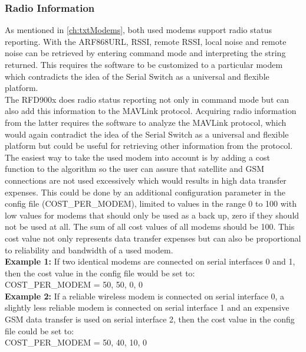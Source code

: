 \subsubsection{Radio Information}
As mentioned in \autoref{ch:txtModems}, both used modems support radio status reporting. With the ARF868URL, RSSI, remote RSSI, local noise and remote noise can be retrieved by entering command mode and interpreting the string returned. This requires the software to be customized to a particular modem which contradicts the idea of the Serial Switch as a universal and flexible platform.\\
The RFD900x does radio status reporting not only in command mode but can also add this information to the MAVLink protocol. Acquiring radio information from the latter requires the software to analyze the MAVLink protocol, which would again contradict the idea of the Serial Switch as a universal and flexible platform but could be useful for retrieving other information from the protocol.\\
The easiest way to take the used modem into account is by adding a cost function to the algorithm so the user can assure that satellite and GSM connections are not used excessively which would results in high data transfer expenses. This could be done by an additional configuration parameter in the config file (COST\_PER\_MODEM), limited to values in the range 0 to 100 with low values for modems that should only be used as a back up, zero if they should not be used at all. The sum of all cost values of all modems should be 100. This cost value not only represents data transfer expenses but can also be proportional to reliability and bandwidth of a used modem.\\
\textbf{Example 1:} If two identical modems are connected on serial interfaces 0 and 1, then the cost value in the config file would be set to:\\
COST\_PER\_MODEM = 50, 50, 0, 0\\
\textbf{Example 2:} If a reliable wireless modem is connected on serial interface 0, a slightly less reliable modem is connected on serial interface 1 and an expensive GSM data transfer is used on serial interface 2, then the cost value in the config file could be set to:\\
COST\_PER\_MODEM = 50, 40, 10, 0
%

